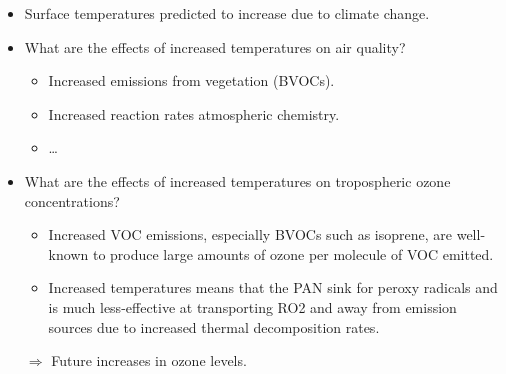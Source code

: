 \begin{BlueBox}
    \vskip-1cm
    \begin{block}{}
        \begin{itemize}
            \item Surface temperatures predicted to increase due to climate change.
            \item What are the effects of increased temperatures on air quality?
                \begin{itemize}
                    \item Increased emissions from vegetation (BVOCs).
                    \item Increased reaction rates atmospheric chemistry.
                    \item \ldots
                \end{itemize}
            \item What are the effects of increased temperatures on tropospheric ozone concentrations?
                \begin{itemize}
                    \item Increased VOC emissions, especially BVOCs such as isoprene, are well-known to produce large amounts of ozone per molecule of VOC emitted.
                    \item Increased temperatures means that the PAN sink for peroxy radicals and  is much less-effective at transporting RO2 and  away from emission sources due to increased thermal decomposition rates.  
                \end{itemize}
            $\Rightarrow$ Future increases in ozone levels.
        \end{itemize}
    \end{block}
\end{BlueBox}
